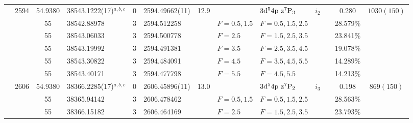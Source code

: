 \begin{table*}
\begin{center}
{\begin{tabular}{:l;l;c;l;c;l;c;l;l;c;c;c;c}
                                  & 2594   & 54.9380   & 38543.1222(17)$^{a,b,c}$         & 0 &    2594.49662(11)  & 12.9 & $                                        $ & $3\rm{d}^54\rm{p~z}^7\rm{P}_3            $ & $i_{2} $ &              & 0.280     & $ 1030(150)$\\
\rowstyle{\itshape}               &        & 55        & 38542.88978$^{}$                 & 3 &   2594.512258      &      & $F=0.5,1.5                               $ & $F=0.5,1.5,2.5                           $ & $      $ &              & 28.579\%  & $          $\\
\rowstyle{\itshape}               &        & 55        & 38543.06033$^{}$                 & 3 &   2594.500778      &      & $F=2.5                                   $ & $F=1.5,2.5,3.5                           $ & $      $ &              & 23.841\%  & $          $\\
\rowstyle{\itshape}               &        & 55        & 38543.19992$^{}$                 & 3 &   2594.491381      &      & $F=3.5                                   $ & $F=2.5,3.5,4.5                           $ & $      $ &              & 19.078\%  & $          $\\
\rowstyle{\itshape}               &        & 55        & 38543.30822$^{}$                 & 3 &   2594.484091      &      & $F=4.5                                   $ & $F=3.5,4.5,5.5                           $ & $      $ &              & 14.289\%  & $          $\\
\rowstyle{\itshape}               &        & 55        & 38543.40171$^{}$                 & 3 &   2594.477798      &      & $F=5.5                                   $ & $F=4.5,5.5                               $ & $      $ &              & 14.213\%  & $          $\\
                                  & 2606   & 54.9380   & 38366.2285(17)$^{a,b,c}$         & 0 &    2606.45896(11)  & 13.0 & $                                        $ & $3\rm{d}^54\rm{p~z}^7\rm{P}_2            $ & $i_{3} $ &              & 0.198     & $  869(150)$\\
\rowstyle{\itshape}               &        & 55        & 38365.94142$^{}$                 & 3 &   2606.478462      &      & $F=0.5,1.5                               $ & $F=0.5,1.5,2.5                           $ & $      $ &              & 28.563\%  & $          $\\
\rowstyle{\itshape}               &        & 55        & 38366.15182$^{}$                 & 3 &   2606.464169      &      & $F=2.5                                   $ & $F=1.5,2.5,3.5                           $ & $      $ &              & 23.793\%  & $          $\\

\end{tabular}}
\end{center}
\end{table*}
